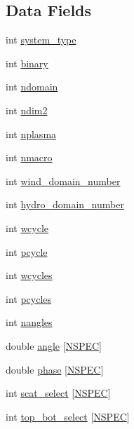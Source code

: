 \subsection*{Data Fields}
\begin{DoxyCompactItemize}
\item 
int \hyperlink{structgeometry_aa1d0031436952c2a2fdc2506c137b3d8}{system\+\_\+type}
\item 
int \hyperlink{structgeometry_a39a1864fe337a607110ca812817ce4f4}{binary}
\item 
int \hyperlink{structgeometry_a781ad48d18a8d675b84414f1ba7a352d}{ndomain}
\item 
int \hyperlink{structgeometry_a6f369fbf8e117ef039235b7f20d04e32}{ndim2}
\item 
int \hyperlink{structgeometry_a05ad401e559d8befe32c134cb5af4efa}{nplasma}
\item 
int \hyperlink{structgeometry_af6c5aca7a11b72347a7b12e8f50cc854}{nmacro}
\item 
int \hyperlink{structgeometry_ad5f13d453a358b8d069e20497b7edf9d}{wind\+\_\+domain\+\_\+number}
\item 
int \hyperlink{structgeometry_a9e4e74de249210566125f8254f468184}{hydro\+\_\+domain\+\_\+number}
\item 
int \hyperlink{structgeometry_ab344978ef2535435535587ec5d5a3d6e}{wcycle}
\item 
int \hyperlink{structgeometry_a5c5643e70e2f927fac6f1ff6e9ecb489}{pcycle}
\item 
int \hyperlink{structgeometry_aa741269f119248a897fc45d181117656}{wcycles}
\item 
int \hyperlink{structgeometry_af1df42c04bb7980f13bbb390f7fbb222}{pcycles}
\item 
int \hyperlink{structgeometry_a15530f8a501f4fad4572e8e751707af9}{nangles}
\item 
double \hyperlink{structgeometry_a47aa76b952a45aeef55a33feb4c2b531}{angle} \mbox{[}\hyperlink{python_8h_ade1df1cb82ae4ef9a5c0cddb37d9a73b}{N\+S\+P\+EC}\mbox{]}
\item 
double \hyperlink{structgeometry_afbde871884638b579979cc55b7e7871d}{phase} \mbox{[}\hyperlink{python_8h_ade1df1cb82ae4ef9a5c0cddb37d9a73b}{N\+S\+P\+EC}\mbox{]}
\item 
int \hyperlink{structgeometry_aaede16ca055dbc6f8297e4ed58c4082d}{scat\+\_\+select} \mbox{[}\hyperlink{python_8h_ade1df1cb82ae4ef9a5c0cddb37d9a73b}{N\+S\+P\+EC}\mbox{]}
\item 
int \hyperlink{structgeometry_a7ec4db1a56c0b84abac1c2d5411e05b0}{top\+\_\+bot\+\_\+select} \mbox{[}\hyperlink{python_8h_ade1df1cb82ae4ef9a5c0cddb37d9a73b}{N\+S\+P\+EC}\mbox{]}

\end{DoxyCompactItemize}
